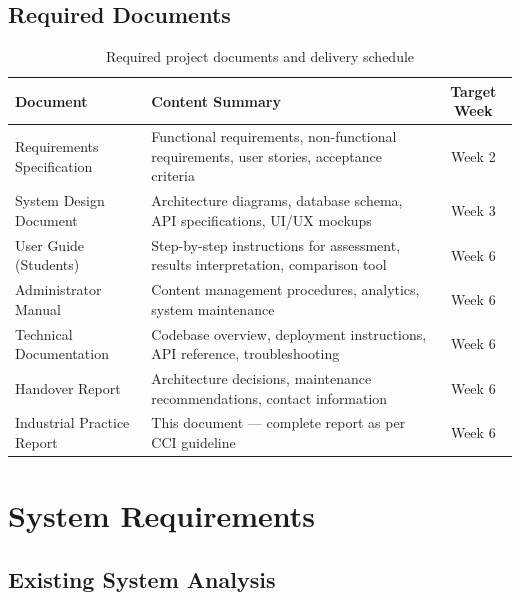 ﻿\documentclass[12pt, a4paper]{article}
\newcommand{\theadrow}{\rowcolor{tableheader}}
\newcommand{\rowalt}{\rowcolor{tablerowalt}}
\begin{document}
\subsection{Required Documents}

\begin{table}[H]
\centering
\begin{tabularx}{\textwidth}{p{4cm}Xc}
\toprule
\theadrow
\textbf{Document} & \textbf{Content Summary} & \textbf{Target Week} \\
\midrule
Requirements Specification & Functional requirements, non-functional requirements, user stories, acceptance criteria & Week 2 \\[3pt]
\rowalt
System Design Document     & Architecture diagrams, database schema, API specifications, UI/UX mockups & Week 3 \\[3pt]
User Guide (Students)      & Step-by-step instructions for assessment, results interpretation, comparison tool & Week 6 \\[3pt]
\rowalt
Administrator Manual       & Content management procedures, analytics, system maintenance & Week 6 \\[3pt]
Technical Documentation    & Codebase overview, deployment instructions, API reference, troubleshooting & Week 6 \\[3pt]
\rowalt
Handover Report            & Architecture decisions, maintenance recommendations, contact information & Week 6 \\[3pt]
Industrial Practice Report & This document --- complete report as per CCI guideline & Week 6 \\
\bottomrule
\end{tabularx}
\caption{Required project documents and delivery schedule}
\end{table}

\clearpage

\section{System Requirements}

\subsection{Existing System Analysis}
\end{document}
